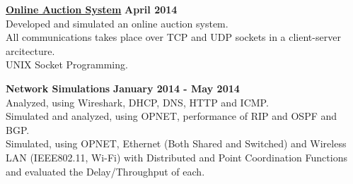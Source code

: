 \documentclass[margin,line]{resume}
\begin{document}
\begin{resume}
    \textbf{\listing \href{https://github.com/bmyfish/Online-Auction-System}{Online Auction System}} \hfill \textbf{April 2014}\vspace{2mm}\\
    Developed and simulated an online auction system.\\
    All communications takes place over TCP and UDP sockets in a client-server arcitecture.\\
    UNIX Socket Programming.
    
    \textbf{\listing Network Simulations} \hfill \textbf{January 2014 - May 2014}\vspace{2mm}\\
    Analyzed, using Wireshark, DHCP, DNS, HTTP and ICMP.\\
    Simulated and analyzed, using OPNET, performance of RIP and OSPF and BGP.\\
    Simulated, using OPNET, Ethernet (Both Shared and Switched) and Wireless LAN (IEEE802.11, Wi-Fi) with Distributed and Point Coordination Functions and evaluated the Delay/Throughput of each.
    

	
\end{resume}
\end{document}
